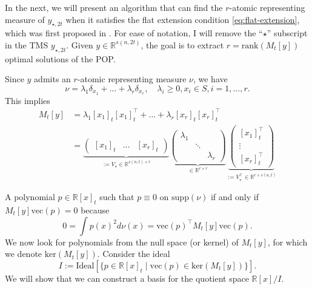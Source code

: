 \documentclass[
]{book}
\theoremstyle{definition}
\theoremstyle{definition}
\theoremstyle{definition}
\theoremstyle{definition}
\theoremstyle{remark}
\begin{document}
In the next, we will present an algorithm that can find the \(r\)-atomic representing measure of \(y_{\star,2t}\) when it satisfies the flat extension condition \eqref{eq:flat-extension}, which was first proposed in \citep{henrion05ppc-detecting}. For ease of notation, I will remove the ``\(\star\)'' subscript in the TMS \(y_{\star,2t}\). Given \(y \in \mathbb{R}^{s(n,2t)}\), the goal is to extract \(r = \mathrm{rank}(M_t[y])\) optimal solutions of the POP.

Since \(y\) admits an \(r\)-atomic representing measure \(\nu\), we have
\[
\nu = \lambda_1 \delta_{x_1} + \dots + \lambda_r \delta_{x_r}, \quad \lambda_i \geq 0, x_i \in S, i=1,\dots,r.
\]
This implies
\begin{equation}
\begin{split}
M_t[y] & = \lambda_1 [x_1]_t [x_1]_t^\top+ \dots + \lambda_r [x_r]_t [x_r]_t^\top\\
& = \underbrace{\begin{pmatrix} [x_1]_t & \dots & [x_r]_t \end{pmatrix}}_{:= V_\star \in \mathbb{R}^{s(n,t) \times r}}
\underbrace{\begin{pmatrix} \lambda_1 &  &  \\
 & \ddots & \\
 &  & \lambda_r \end{pmatrix}}_{\in \mathbb{R}^{r \times r}}
\underbrace{\begin{pmatrix}
[x_1]_t^\top\\
\vdots \\
[x_r]_t^\top
 \end{pmatrix}}_{:= V_\star^\top\in \mathbb{R}^{r \times s(n,t)}}
\end{split}
\end{equation}

A polynomial \(p \in \mathbb{R}[x]_t\) such that \(p \equiv 0\) on \(\mathrm{supp}(\nu)\) if and only if \(M_t[y] \mathrm{vec}(p) = 0\) because
\[
0 = \int p(x)^2 d\nu(x) = \mathrm{vec}(p)^\top M_t[y] \mathrm{vec}(p).
\]
We now look for polynomials from the null space (or kernel) of \(M_t[y]\), for which we denote \(\mathrm{ker}(M_t[y])\). Consider the ideal
\[
I := \mathrm{Ideal}[ \{ p \in \mathbb{R}[x]_t \mid \mathrm{vec}(p) \in \mathrm{ker}(M_t[y]) \} ].
\]
We will show that we can construct a basis for the quotient space \(\mathbb{R}[x] / I\).
\end{document}
